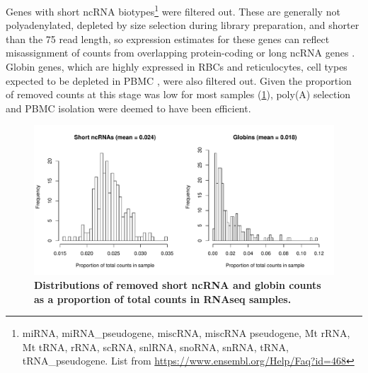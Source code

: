 Genes with short \gls{ncRNA} biotypes\footnote{miRNA, miRNA\_pseudogene, miscRNA, miscRNA pseudogene, Mt rRNA, Mt tRNA, rRNA, scRNA, snlRNA, snoRNA, snRNA, tRNA, tRNA\_pseudogene. List from \url{https://www.ensembl.org/Help/Faq?id=468}} were filtered out.
These are generally not polyadenylated, depleted by size selection during library preparation, and shorter than the \SI{75}{\bp} read length, so expression estimates for these genes can reflect misassignment of counts from overlapping protein-coding or long \gls{ncRNA} genes \autocite{zhao2018EvaluationTwoMain}.
%
Globin genes, which are highly expressed in \glspl{RBC} and reticulocytes, cell types expected to be depleted in \gls{PBMC}  \autocite{min2010VariabilityGeneExpression}, were also filtered out.
Given the proportion of removed counts at this stage was low for most samples (\cref{fig:hird_shortncRNA_and_globins}), 
poly(A) selection and \gls{PBMC} isolation were deemed to have been efficient.

\begin{figure}
    \centering
    \includegraphics[width=1.0\textwidth, page=1]{mainmatter/figures/chapter_02/rnaseq_data_setup.per_sample.short_ncRNA_globin_levels_hist.pdf}
    \caption{\textbf{Distributions of removed short \gls{ncRNA} and globin counts as a proportion of total counts in \gls{RNAseq} samples.}}
    \label{fig:hird_shortncRNA_and_globins}
\end{figure}

